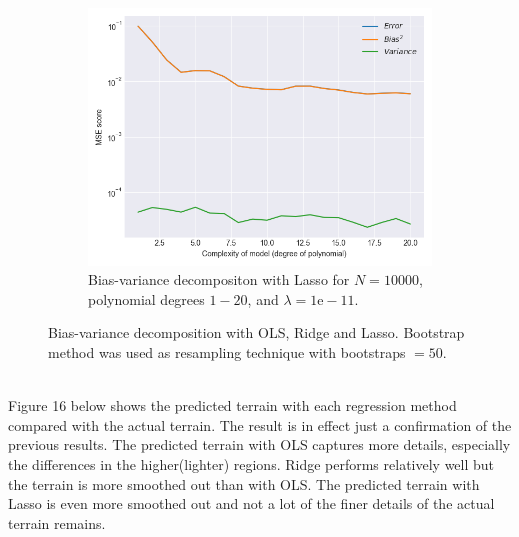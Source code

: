 \documentclass[a4paper,twocolumn]{article}
\begin{document}
\begin{figure}[ht]
\begin{subfigure}{0.475\columnwidth}
    \end{subfigure}\\[1ex]
    \centering
    \begin{subfigure}{0.5\columnwidth}
        \centering
        \includegraphics[width=\columnwidth]{bias_variance_tradeoff_Lasso_Lambda=1e-11_Bootstraps=50_N=10000_Noise=0.0_Degree=1-20.png}
        \caption{Bias-variance decompositon with Lasso for $N=10000$, polynomial degrees $1-20$, and $\lambda = 1\textrm{e}-11$.}
    \end{subfigure}
    \caption{Bias-variance decomposition with OLS, Ridge and Lasso. Bootstrap method was used as resampling technique with bootstraps $=50$.}
\end{figure}\\
Figure 16 below shows the predicted terrain with each regression method compared with the actual terrain. The result is in effect just a confirmation of the previous results. The predicted terrain with OLS captures more details, especially the differences in the higher(lighter) regions. Ridge performs relatively well but the terrain is more smoothed out than with OLS. The predicted terrain with Lasso is even more smoothed out and not a lot of the finer details of the actual terrain remains.
\end{document}
